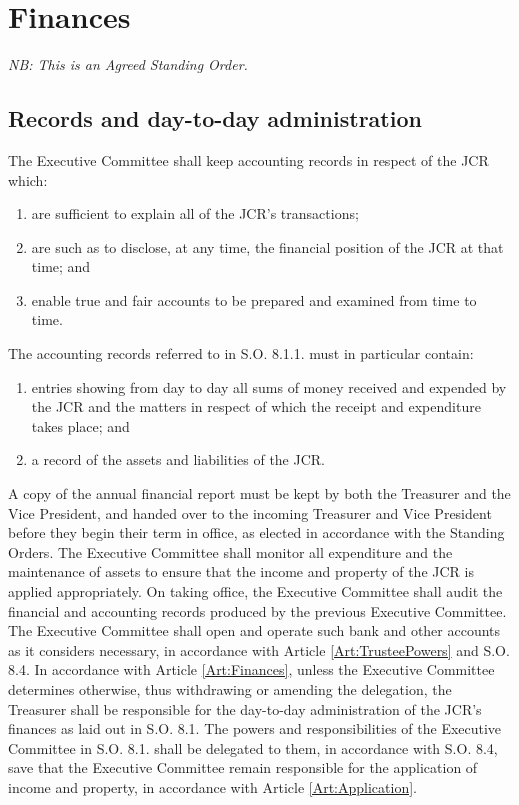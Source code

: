 \chapter{Finances}
\textit{NB: This is an Agreed Standing Order.}
\section{Records and day-to-day administration}
\npara The Executive Committee shall keep accounting records in respect of the JCR which:
\begin{enumerate}
\item are sufficient to explain all of the JCR's transactions;
\item are such as to disclose, at any time, the financial position of the JCR at that time; and
\item enable true and fair accounts to be prepared and examined from time to time.
\end{enumerate}
\npara The accounting records referred to in S.O. 8.1.1. must in particular contain:
\begin{enumerate}
\item entries showing from day to day all sums of money received and expended by the JCR and the matters in respect of which the receipt and expenditure takes place; and
\item a record of the assets and liabilities of the JCR.
\end{enumerate}
\npara A copy of the annual financial report must be kept by both the Treasurer and the Vice President, and handed over to the incoming Treasurer and Vice President before they begin their term in office, as elected in accordance with the Standing Orders.
\npara The Executive Committee shall monitor all expenditure and the maintenance of assets to ensure that the income and property of the JCR is applied appropriately.
\npara On taking office, the Executive Committee shall audit the financial and accounting records produced by the previous Executive Committee.
\npara The Executive Committee shall open and operate such bank and other accounts as it considers  necessary, in accordance with Article \ref{Art:TrusteePowers} and S.O. 8.4.
\npara In accordance with Article \ref{Art:Finances}, unless the Executive Committee determines otherwise, thus withdrawing or amending the delegation, the Treasurer shall be responsible for the day-to-day administration of the JCR's finances as laid out in S.O. 8.1.  The powers and responsibilities of the Executive Committee in S.O. 8.1. shall be delegated to them, in accordance with S.O. 8.4, save that the Executive Committee remain responsible for the application of income and property, in accordance with Article \ref{Art:Application}.
